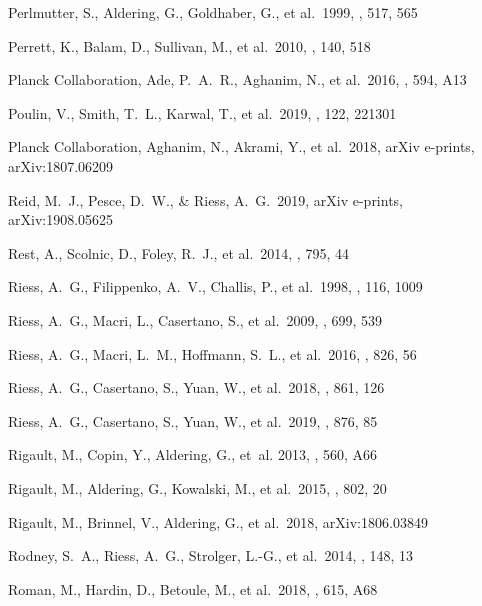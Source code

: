 \documentclass[]{aa} %
\begin{document}
\begin{thebibliography}{}
 Perlmutter, S., Aldering, G., Goldhaber, G., et al.\ 1999, \apj, 517, 565

 Perrett, K., Balam, D., Sullivan, M., et al.\ 2010, \aj, 140, 518

 Planck Collaboration, Ade, P.~A.~R., Aghanim, N., et al.\ 2016, \aap, 594, A13

 Poulin, V., Smith, T.~L., Karwal, T., et al.\ 2019, \prl, 122, 221301

 Planck Collaboration, Aghanim, N., Akrami, Y., et al.\ 2018, arXiv e-prints, arXiv:1807.06209

 Reid, M.~J., Pesce, D.~W., \& Riess, A.~G.\ 2019, arXiv e-prints, arXiv:1908.05625

 Rest, A., Scolnic, D., Foley, R.~J., et al.\ 2014, \apj, 795, 44

 Riess, A.~G., Filippenko, A.~V., Challis, P., et al.\ 1998, \aj, 116, 1009

 Riess, A.~G., Macri, L., Casertano, S., et al.\ 2009, \apj, 699, 539

 Riess, A.~G., Macri, L.~M., Hoffmann, S.~L., et al.\ 2016, \apj, 826, 56

 Riess, A.~G., Casertano, S., Yuan, W., et al.\ 2018, \apj, 861, 126

 Riess, A.~G., Casertano, S., Yuan, W., et al.\ 2019, \apj, 876, 85

Rigault, M., Copin, Y., Aldering, G., {et~al.} 2013, \aap, 560, A66

 Rigault, M., Aldering, G., Kowalski, M., et al.\ 2015, \apj, 802, 20

 Rigault, M.,
  Brinnel, V., Aldering, G., et al.\ 2018, arXiv:1806.03849

 Rodney, S.~A.,
  Riess, A.~G., Strolger, L.-G., et al.\ 2014, \aj, 148, 13 
  
 Roman, M., Hardin, D., Betoule, M., et al.\ 2018, \aap, 615, A68


\end{thebibliography}
\end{document}
